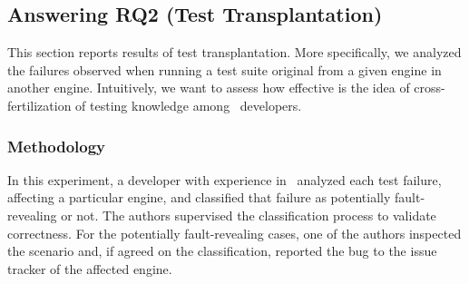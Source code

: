 \documentclass[smallextended]{svjour3}
\begin{document}
\begin{center}
\end{center}


\subsection{Answering RQ2 (Test Transplantation)}
\label{sec:transplantation}

This section reports results of test transplantation. More
specifically, we analyzed the failures observed when running a test
suite original from a given engine in another engine. Intuitively, we
want to assess how effective is the idea of cross-fertilization of
testing knowledge among \js\ developers.

\subsubsection{Methodology}
\label{sec:methodology}
In this experiment, a developer with experience in \js\ analyzed each
test failure, affecting a particular engine, and classified that
failure as potentially fault-revealing or not. The authors supervised
the classification process to validate correctness. For the
potentially fault-revealing cases, one of the authors inspected the
scenario and, if agreed on the classification, reported the bug to the
issue tracker of the affected engine.
\end{document}
